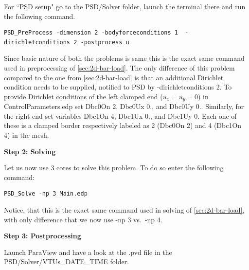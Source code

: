 \documentclass{report}
\begin{document}
For ``PSD setup" go to the {\ttfamily PSD/Solver} folder, launch the terminal there and run the following command.
\begin{lstlisting}[style=Linux]
PSD_PreProcess -dimension 2 -bodyforceconditions 1  -dirichletconditions 2 -postprocess u
\end{lstlisting}
%
Since basic nature of both the problems is same this is the exact same command used in preprocessing of \cref{sec:2d-bar-load}. The only difference of this problem compared to the one from \cref{sec:2d-bar-load} is that an additional Dirichlet condition needs to be supplied, notified to PSD by {\ttfamily -dirichletconditions 2}. To provide Dirichlet conditions of the left clamped end ($u_x=u_y=0$) in {\ttfamily ControlParameters.edp} set {\ttfamily Dbc0On 2}, {\ttfamily Dbc0Ux 0.}, and {\ttfamily Dbc0Uy 0.}. Similarly, for the right end set variables {\ttfamily Dbc1On 4}, {\ttfamily Dbc1Ux 0.}, and {\ttfamily Dbc1Uy 0}. Each one of these is a clamped border respectively labeled as 2  ({\ttfamily Dbc0On 2}) and 4 ({\ttfamily Dbc1On 4}) in the mesh.

\textbf{Step 2: Solving}

Let us now use  3 cores to solve this problem. To do so enter the following command:

\begin{lstlisting}[style=Linux]
PSD_Solve -np 3 Main.edp
\end{lstlisting}
%
Notice, that this is the exact same command used in solving of \cref{sec:2d-bar-load}, with only difference that we now use {\ttfamily -np 3} vs.~{\ttfamily -np 4}.


\textbf{Step 3: Postprocessing}

Launch ParaView and have a look at the  {\ttfamily .pvd} file in the  {\ttfamily PSD/Solver/VTUs\_DATE\_TIME} folder. 
\end{document}
